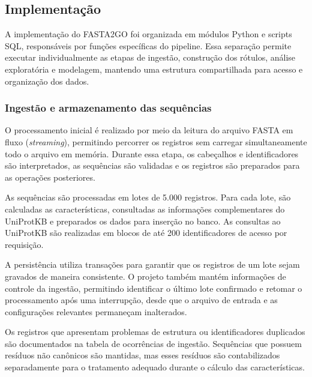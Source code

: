 
\subsection{Implementação}
\label{sec:implementacao}

A implementação do FASTA2GO foi organizada em módulos Python e scripts SQL, responsáveis por funções específicas do pipeline. Essa separação permite executar individualmente as etapas de ingestão, construção dos rótulos, análise exploratória e modelagem, mantendo uma estrutura compartilhada para acesso e organização dos dados.

\subsubsection{Ingestão e armazenamento das sequências}

O processamento inicial é realizado por meio da leitura do arquivo FASTA em fluxo (\textit{streaming}), permitindo percorrer os registros sem carregar simultaneamente todo o arquivo em memória. Durante essa etapa, os cabeçalhos e identificadores são interpretados, as sequências são validadas e os registros são preparados para as operações posteriores.

As sequências são processadas em lotes de 5.000 registros. Para cada lote, são calculadas as características, consultadas as informações complementares do UniProtKB e preparados os dados para inserção no banco. As consultas ao UniProtKB são realizadas em blocos de até 200 identificadores de acesso por requisição.

A persistência utiliza transações para garantir que os registros de um lote sejam gravados de maneira consistente. O projeto também mantém informações de controle da ingestão, permitindo identificar o último lote confirmado e retomar o processamento após uma interrupção, desde que o arquivo de entrada e as configurações relevantes permaneçam inalterados.

Os registros que apresentam problemas de estrutura ou identificadores duplicados são documentados na tabela de ocorrências de ingestão. Sequências que possuem resíduos não canônicos são mantidas, mas esses resíduos são contabilizados separadamente para o tratamento adequado durante o cálculo das características.

